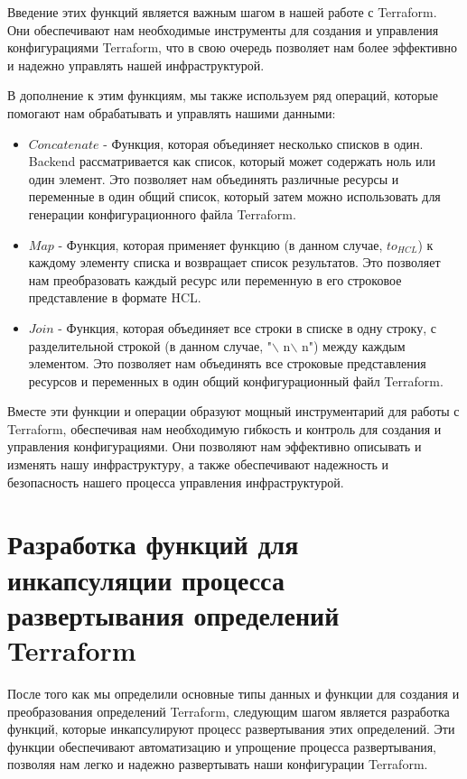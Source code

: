 Введение этих функций является важным шагом в нашей работе с Terraform. Они
обеспечивают нам необходимые инструменты для создания и управления
конфигурациями Terraform, что в свою очередь позволяет нам более эффективно и
надежно управлять нашей инфраструктурой.

В дополнение к этим функциям, мы также используем ряд операций, которые помогают
нам обрабатывать и управлять нашими данными:

\begin{itemize}
\item $Concatenate$ - Функция, которая объединяет несколько списков в один.
Backend рассматривается как список, который может содержать ноль или один
элемент. Это позволяет нам объединять различные ресурсы и переменные в один
общий список, который затем можно использовать для генерации конфигурационного
файла Terraform.

\item $Map$ - Функция, которая применяет функцию (в данном случае, $to_{HCL}$) к
каждому элементу списка и возвращает список результатов. Это позволяет нам
преобразовать каждый ресурс или переменную в его строковое представление в
формате HCL.

\item $Join$ - Функция, которая объединяет все строки в списке в одну строку, с
разделительной строкой (в данном случае, "$\backslash$ n$\backslash$ n") между
каждым элементом. Это позволяет нам объединять все строковые представления
ресурсов и переменных в один общий конфигурационный файл Terraform.
\end{itemize}

Вместе эти функции и операции образуют мощный инструментарий для работы с
\newline
Terraform, обеспечивая нам необходимую гибкость и контроль для создания и
управления конфигурациями. Они позволяют нам
эффективно описывать и изменять нашу инфраструктуру, а также обеспечивают
надежность и безопасность нашего процесса управления инфраструктурой.


\section{Разработка функций для инкапсуляции процесса развертывания определений
Terraform}


После того как мы определили основные типы данных и функции для создания и
преобразования определений Terraform, следующим шагом является разработка
функций, которые инкапсулируют процесс развертывания этих определений. Эти
функции обеспечивают автоматизацию и упрощение процесса развертывания, позволяя
нам легко и надежно развертывать наши конфигурации Terraform.

